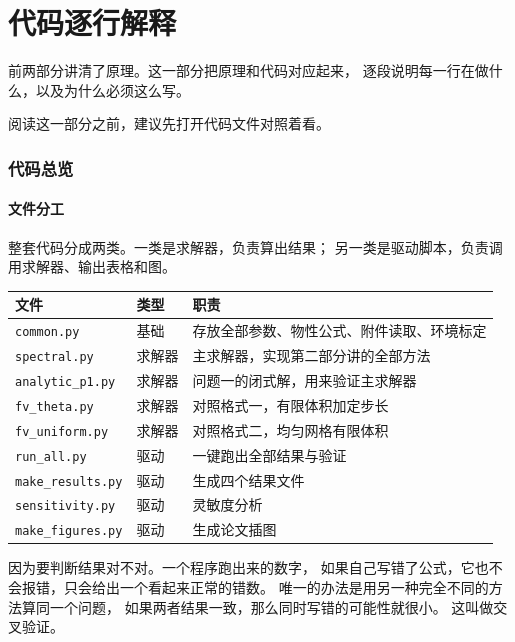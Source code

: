 \part{代码逐行解释}

前两部分讲清了原理。这一部分把原理和代码对应起来，
逐段说明每一行在做什么，以及为什么必须这么写。

阅读这一部分之前，建议先打开代码文件对照着看。

\section{代码总览}

\subsection{文件分工}

整套代码分成两类。一类是求解器，负责算出结果；
另一类是驱动脚本，负责调用求解器、输出表格和图。

\begin{center}
\begin{tabular}{@{}llp{7.4cm}@{}}
\toprule
文件 & 类型 & 职责 \\
\midrule
\texttt{common.py} & 基础 & 存放全部参数、物性公式、附件读取、环境标定 \\
\texttt{spectral.py} & 求解器 & 主求解器，实现第二部分讲的全部方法 \\
\texttt{analytic\_p1.py} & 求解器 & 问题一的闭式解，用来验证主求解器 \\
\texttt{fv\_theta.py} & 求解器 & 对照格式一，有限体积加定步长 \\
\texttt{fv\_uniform.py} & 求解器 & 对照格式二，均匀网格有限体积 \\
\texttt{run\_all.py} & 驱动 & 一键跑出全部结果与验证 \\
\texttt{make\_results.py} & 驱动 & 生成四个结果文件 \\
\texttt{sensitivity.py} & 驱动 & 灵敏度分析 \\
\texttt{make\_figures.py} & 驱动 & 生成论文插图 \\
\bottomrule
\end{tabular}
\end{center}

因为要判断结果对不对。一个程序跑出来的数字，
如果自己写错了公式，它也不会报错，只会给出一个看起来正常的错数。
唯一的办法是用另一种完全不同的方法算同一个问题，
如果两者结果一致，那么同时写错的可能性就很小。
这叫做交叉验证。

